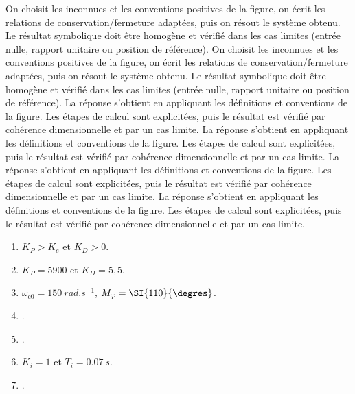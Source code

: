 \begin{corrigebox}
On choisit les inconnues et les conventions positives de la figure,
        on écrit les relations de conservation/fermeture adaptées, puis on résout le
        système obtenu. Le résultat symbolique doit être homogène et vérifié dans les cas
        limites (entrée nulle, rapport unitaire ou position de référence).
On choisit les inconnues et les conventions positives de la figure,
        on écrit les relations de conservation/fermeture adaptées, puis on résout le
        système obtenu. Le résultat symbolique doit être homogène et vérifié dans les cas
        limites (entrée nulle, rapport unitaire ou position de référence).
La réponse s'obtient en appliquant les définitions et conventions de la
    figure. Les étapes de calcul sont explicitées, puis le résultat est vérifié par
    cohérence dimensionnelle et par un cas limite.
La réponse s'obtient en appliquant les définitions et conventions de la
    figure. Les étapes de calcul sont explicitées, puis le résultat est vérifié par
    cohérence dimensionnelle et par un cas limite.
La réponse s'obtient en appliquant les définitions et conventions de la
    figure. Les étapes de calcul sont explicitées, puis le résultat est vérifié par
    cohérence dimensionnelle et par un cas limite.
La réponse s'obtient en appliquant les définitions et conventions de la
    figure. Les étapes de calcul sont explicitées, puis le résultat est vérifié par
    cohérence dimensionnelle et par un cas limite.
\begin{enumerate}
\item $K_P>K_e$ et $K_D>0$.
\item $K_P = 5900$ et $K_D = 5,5$.
\item $\omega_{\text{c0}}=\SI{150}{rad.s^{-1}}$, $M_{\varphi}=\SI{110}{\degres}$.
\item .
\item .
\item $K_i=1$ et $T_i = \SI{0,07}{s}$.
\item .
\end{enumerate}
\end{corrigebox}
